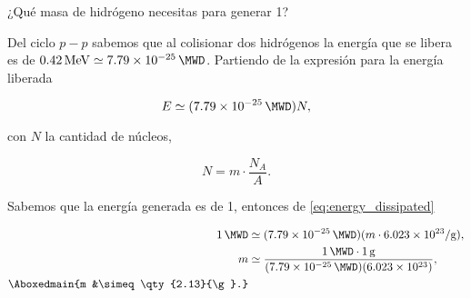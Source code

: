\documentclass[./../main.tex]{subfiles}
\begin{document}
	\begin{exercise}
		¿Qué masa de hidrógeno necesitas para generar \qty[inter-unit-product=]{1}{\MWD}?

		\begin{solution}
			Del ciclo \(p-p\) sabemos que al colisionar dos hidrógenos la energía que se libera es de \(\qty{0.42}{\MeV} \simeq \qty{7.79e-25}{\MWD}\). Partiendo de la expresión para la energía liberada

			\begin{equation}
				E \simeq (\qty{7.79e-25}{\MWD})N,
				\label{eq:energy_dissipated}
			\end{equation}

			con \(N\) la cantidad de núcleos, \idest

			\begin{equation*}
				N = m \cdot \dfrac{N_{A}}{A}.
			\end{equation*}

			Sabemos que la energía generada es de \qty{1}{\MWD}, entonces de \cref{eq:energy_dissipated}

			\begin{align*}
				\qty{1}{\MWD} &\simeq (\qty{7.79e-25}{\MWD})(m \cdot \qty[per-mode=symbol]{6.023e23}{\per\g}),\\
				m &\simeq \dfrac{\qty{1}{\MWD}\cdot\qty{1}{\g}}{(\qty{7.79e-25}{\MWD})(\num{6.023e23})},\\
				\Aboxedmain{m &\simeq \qty{2.13}{\g}.}
			\end{align*}
		\end{solution}
	\end{exercise}
\end{document}
